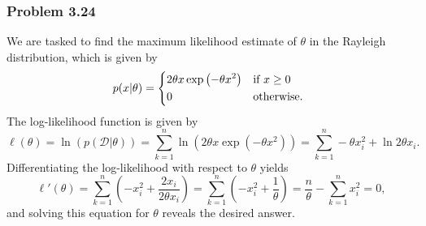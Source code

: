 \documentclass[12pt, a4paper]{article}
\newcommand{\D}{\mathcal{D}}
\begin{document}
\subsubsection*{Problem 3.24}
We are tasked to find the maximum likelihood estimate of $\theta$ in the Rayleigh distribution, which is given by
\begin{equation*}
	p (x | \theta) = 
	\begin{dcases*}
	2 \theta x \exp \left( -\theta x^2 \right) & if $x \geq 0$ \\
	0 & otherwise.
	\end{dcases*}
\end{equation*}
The log-likelihood function is given by
\begin{equation*}
	\ell(\theta)= \ln \left( p (\D | \theta) \right) 
	= 
	\sum_{k=1}^{n} \ln \left( 2 \theta x \exp \left( -\theta x^2 \right) \right)
	= 
	\sum_{k=1}^{n} - \theta x_i^2 + \ln 2 \theta x_i.
\end{equation*}
Differentiating the log-likelihood with respect to $\theta$ yields
\begin{equation*}
	\ell'(\theta) =
	\sum_{k=1}^{n} \left(-  x_i^2 + \frac{2 x_i}{2 \theta x_i}\right)
	=
	\sum_{k=1}^{n} \left(-  x_i^2 + \frac{1}{\theta}\right)
	=
	\frac{n}{\theta} - \sum_{k=1}^{n}  x_i^2 
	= 0,
\end{equation*}
and solving this equation for $\theta$ reveals the desired answer.
\end{document}
